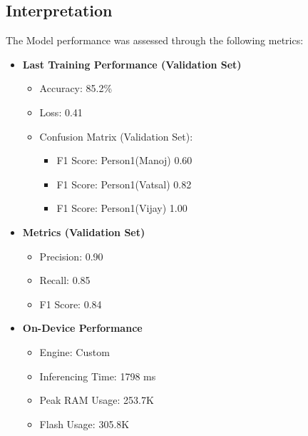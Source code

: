 \subsection{Interpretation}
The Model performance was assessed through the following metrics:
\begin{itemize}
	\item \textbf{Last Training Performance (Validation Set)}
	\begin{itemize}
		\item Accuracy: 85.2\%
		\item Loss: 0.41
		\item Confusion Matrix (Validation Set):
		\begin{itemize}
			\item F1 Score: Person1(Manoj) 0.60
			\item F1 Score: Person1(Vatsal) 0.82
			\item F1 Score: Person1(Vijay) 1.00
		\end{itemize}
	\end{itemize}
	
	\item \textbf{Metrics (Validation Set)}
	\begin{itemize}
		\item Precision: 0.90
		\item Recall: 0.85
		\item F1 Score: 0.84
	\end{itemize}
	
	\item \textbf{On-Device Performance}
	\begin{itemize}
		\item Engine: Custom
		\item Inferencing Time: 1798 ms
		\item Peak RAM Usage: 253.7K
		\item Flash Usage: 305.8K
	\end{itemize}
\end{itemize}

